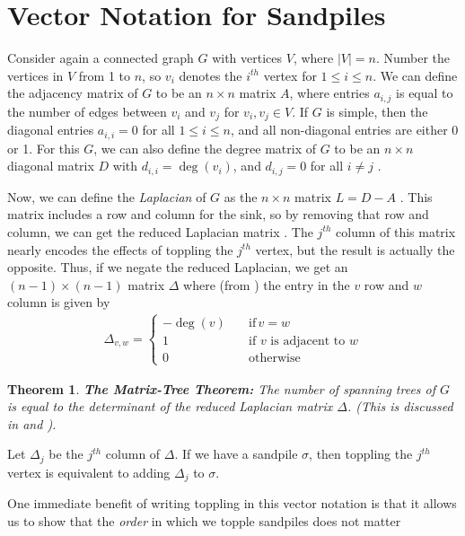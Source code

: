\documentclass[12pt]{article}
\DeclareMathOperator{\dg}{deg}
\newtheorem{theorem}{Theorem}
\begin{document}
\section{Vector Notation for Sandpiles}

Consider again a connected graph $G$ with vertices $V$, where $|V| = n$.  Number the vertices in $V$ from 1 to $n$, so $v_i$ denotes the $i^{th}$ vertex for $1 \leq i \leq n$.  We can define the adjacency matrix of $G$ to be an $n \times n$ matrix $A$, where entries $a_{i, j}$ is equal to the number of edges between $v_i$ and $v_j$ for $v_i, v_j \in V$.  If $G$ is simple, then the diagonal entries $a_{i,i} = 0$ for all $1 \leq i \leq n$, and all non-diagonal entries are either 0 or 1.  For this $G$, we can also define the degree matrix of $G$ to be an $n \times n$ diagonal matrix $D$ with $d_{i,i} = \dg(v_i)$, and $d_{i, j} = 0$ for all $i \neq j$ \cite{glass}.

Now, we can define the \textit{Laplacian} of $G$ as the $n \times n$ matrix $L = D - A$ \cite{glass}.  This matrix includes a row and column for the sink, so by removing that row and column, we can get the reduced Laplacian matrix \cite{glass}.  The $j^{th}$ column of this matrix nearly encodes the effects of toppling the $j^{th}$ vertex, but the result is actually the opposite.  Thus, if we negate the reduced Laplacian, we get an $(n - 1) \times (n - 1)$ matrix $\Delta$ where (from \cite{levine}) the entry in the $v$ row and $w$ column is given by
\begin{align*}
    \Delta_{v, w} = \begin{cases}
    -\dg(v) &\quad \text{if} \, v = w \\
    1 &\quad \text{if $v$ is adjacent to $w$} \\
    0 &\quad \text{otherwise}
    \end{cases}
\end{align*}

\begin{theorem}  \textbf{The Matrix-Tree Theorem:}
    The number of spanning trees of $G$ is equal to the determinant of the reduced Laplacian matrix $\Delta$.  (This is discussed in \cite{levine} and \cite{glass}).
\label{thm:matrix-tree}
\end{theorem}

Let $\Delta_j$ be the $j^{th}$ column of $\Delta$.  If we have a sandpile $\sigma$, then toppling the $j^{th}$ vertex is equivalent to adding $\Delta_j$ to $\sigma$.

One immediate benefit of writing toppling in this vector notation is that it allows us to show that the \textit{order} in which we topple sandpiles does not matter
\end{document}

